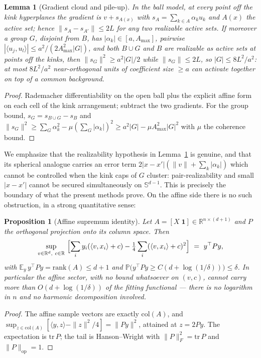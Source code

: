 \documentclass[11pt,reqno]{amsart}
\theoremstyle{plain}
\newtheorem{proposition}[theorem]{Proposition}
\newtheorem{lemma}[theorem]{Lemma}
\theoremstyle{definition}
\theoremstyle{remark}
\newcommand{\R}{\mathbb{R}}
\newcommand{\Sd}{\mathbb{S}^{d-1}}
\newcommand{\PP}{\mathbb{P}}
\newcommand{\EE}{\mathbb{E}}
\newcommand{\inn}[2]{\langle #1,#2\rangle}
\begin{document}
\begin{lemma}[Gradient cloud and pile-up]\label{lem:pileup}
In the ball model, at every point off the kink hyperplanes the gradient is $v+s_{A(x)}$ with $s_A=\sum_{k\in A}\alpha_ku_k$ and $A(x)$ the active set; hence $\|s_A-s_{A'}\|\le2L$ for any two realizable active sets. If moreover a group $G$, disjoint from $B$, has $|\alpha_k|\in[a,A_{\max}]$, pairwise $|\inn{u_j}{u_l}|\le a^2/(2A_{\max}^2|G|)$, and both $B\cup G$ and $B$ are realizable as active sets at points off the kinks, then $\|s_G\|^2\ge a^2|G|/2$ while $\|s_G\|\le2L$, so $|G|\le8L^2/a^2$: at most $8L^2/a^2$ near-orthogonal units of coefficient size $\ge a$ can activate together on top of a common background.
\end{lemma}
\begin{proof}[Proof]
Rademacher differentiability on the open ball plus the explicit affine form on each cell of the kink arrangement; subtract the two gradients. For the group bound, $s_G=s_{B\cup G}-s_B$ and $\|s_G\|^2\ge\sum_G\alpha_k^2-\mu(\sum_G|\alpha_k|)^2\ge a^2|G|-\mu A_{\max}^2|G|^2$ with $\mu$ the coherence bound.
\end{proof}

We emphasize that the realizability hypothesis in Lemma~\ref{lem:pileup} is genuine, and that its spherical analogue carries an error term $2|x-x'|(\|v\|+\sum_k|\alpha_k|)$ which cannot be controlled when the kink caps of $G$ cluster: pair-realizability and small $|x-x'|$ cannot be secured simultaneously on $\Sd$. This is precisely the boundary of what the present methods prove. On the affine side there is no such obstruction, in a strong quantitative sense:

\begin{proposition}[Affine supremum identity]\label{prop:affinesup}
Let $A=[X\;\mathbf1]\in\R^{n\times(d+1)}$ and $P$ the orthogonal projection onto its column space. Then
\[
\sup_{v\in\R^d,\ c\in\R}\ \Bigl[\sum_iy_i(\inn v{x_i}+c)-\tfrac14\sum_i(\inn v{x_i}+c)^2\Bigr]\ =\ y^\top Py,
\]
with $\EE_y\,y^\top Py=\mathrm{rank}(A)\le d+1$ and $\PP\bigl(y^\top Py\ge C(d+\log(1/\delta))\bigr)\le\delta$. In particular the affine sector, with no bound whatsoever on $(v,c)$, cannot carry more than $O(d+\log(1/\delta))$ of the fitting functional --- there is no logarithm in $n$ and no harmonic decomposition involved.
\end{proposition}
\begin{proof}[Proof]
The affine sample vectors are exactly $\mathrm{col}(A)$, and $\sup_{z\in\mathrm{col}(A)}[\inn yz-\|z\|^2/4]=\|Py\|^2$, attained at $z=2Py$. The expectation is $\mathrm{tr}\,P$; the tail is Hanson--Wright \cite[Thm.~6.2.1]{Vershynin} with $\|P\|_F^2=\mathrm{tr}\,P$ and $\|P\|_{\mathrm{op}}=1$.
\end{proof}
\end{document}
